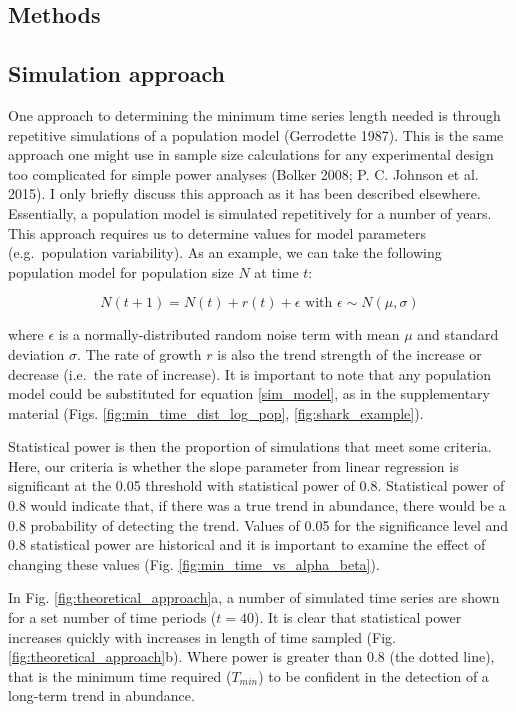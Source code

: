 \documentclass[12pt,]{article}
\begin{document}
\begin{spacing}{2}
\section{Methods}\label{methods}

\subsection{Simulation approach}\label{simulation-approach}

One approach to determining the minimum time series length needed is
through repetitive simulations of a population model (Gerrodette 1987).
This is the same approach one might use in sample size calculations for
any experimental design too complicated for simple power analyses
(Bolker 2008; P. C. Johnson et al. 2015). I only briefly discuss this
approach as it has been described elsewhere. Essentially, a population
model is simulated repetitively for a number of years. This approach
requires us to determine values for model parameters (e.g.~population
variability). As an example, we can take the following population model
for population size \(N\) at time \(t\):

\begin{equation}
N(t + 1) = N(t) + r(t) + \epsilon \mbox{ with } \epsilon \sim N(\mu, \sigma)
\label{sim_model}
\end{equation}

where \(\epsilon\) is a normally-distributed random noise term with mean
\(\mu\) and standard deviation \(\sigma\). The rate of growth \(r\) is
also the trend strength of the increase or decrease (i.e.~the rate of
increase). It is important to note that any population model could be
substituted for equation \ref{sim_model}, as in the supplementary
material (Figs. \ref{fig:min_time_dist_log_pop},
\ref{fig:shark_example}).

Statistical power is then the proportion of simulations that meet some
criteria. Here, our criteria is whether the slope parameter from linear
regression is significant at the 0.05 threshold with statistical power
of 0.8. Statistical power of 0.8 would indicate that, if there was a
true trend in abundance, there would be a 0.8 probability of detecting
the trend. Values of 0.05 for the significance level and 0.8 statistical
power are historical and it is important to examine the effect of
changing these values (Fig. \ref{fig:min_time_vs_alpha_beta}).

In Fig. \ref{fig:theoretical_approach}a, a number of simulated time
series are shown for a set number of time periods (\(t=40\)). It is
clear that statistical power increases quickly with increases in length
of time sampled (Fig. \ref{fig:theoretical_approach}b). Where power is
greater than 0.8 (the dotted line), that is the minimum time required
(\(T_{min}\)) to be confident in the detection of a long-term trend in
abundance.


\end{spacing}
\end{document}

